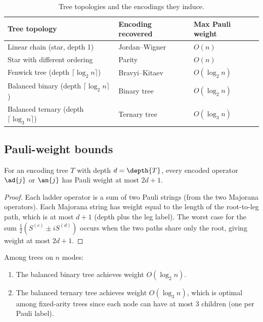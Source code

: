 \begin{table}[h]
\centering
\caption{Tree topologies and the encodings they induce.}
\label{tab:tree-recovery}
\begin{tabular}{@{}lll@{}}
\toprule
Tree topology & Encoding recovered & Max Pauli weight \\
\midrule
Linear chain (star, depth 1) & Jordan--Wigner & $O(n)$ \\
Star with different ordering & Parity & $O(n)$ \\
Fenwick tree (depth $\lceil\log_2 n\rceil$) & Bravyi--Kitaev & $O(\log_2 n)$ \\
Balanced binary (depth $\lceil\log_2 n\rceil$) & Binary tree & $O(\log_2 n)$ \\
Balanced ternary (depth $\lceil\log_3 n\rceil$) & Ternary tree & $O(\log_3 n)$ \\
\bottomrule
\end{tabular}
\end{table}

\subsection{Pauli-weight bounds}

\begin{theorem}
\label{thm:weight-bound}
For an encoding tree $T$ with depth $d = \depth{T}$, every encoded
operator $\ad{j}$ or $\an{j}$ has Pauli weight at most $2d + 1$.
\end{theorem}

\begin{proof}
Each ladder operator is a sum of two Pauli strings (from the two
Majorana operators).  Each Majorana string has weight equal to the
length of the root-to-leg path, which is at most $d + 1$ (depth plus
the leg label).  The worst case for the sum
$\frac{1}{2}(S^{(c)} \pm i S^{(d)})$ occurs when the two paths share
only the root, giving weight at most $2d + 1$.
\end{proof}

\begin{corollary}
\label{cor:optimal-weight}
Among trees on $n$ modes:
\begin{enumerate}
  \item[(a)] The balanced binary tree achieves weight $O(\log_2 n)$.
  \item[(b)] The balanced ternary tree achieves weight $O(\log_3 n)$,
    which is optimal among fixed-arity trees since each node can have
    at most 3 children (one per Pauli label).
\end{enumerate}
\end{corollary}

